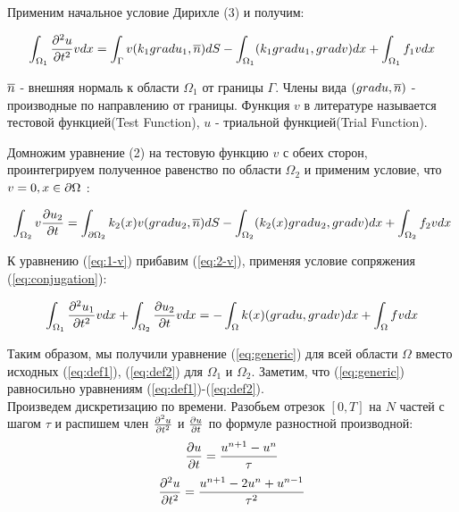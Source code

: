 Применим начальное условие Дирихле (3) и получим:

\begin{equation}
    \int_{\Omega_1} {\frac{\partial^2 u}{\partial t^2}} v dx  = \int_\Gamma v(k_1 gradu_1, \overline{n}) dS - \int_{\Omega_1}(k_1 gradu_1, gradv)dx + \int_{\Omega_1} f_1vdx 
    \label{eq:1-v}
\end{equation}


$\overline{n}$ - внешняя нормаль к области $\Omega_1$ от границы $\Gamma$.
Члены вида $(grad u, \overline{n})$ - производные по направлению от границы. 
Функция $v$ в литературе называется тестовой функцией(Test Function)\cite{bib:logg}, $u$ - триальной функцией(Trial Function).

Домножим уравнение (2) на тестовую функцию $v$ с обеих сторон, проинтегрируем полученное равенство по области $\Omega_2$ и применим условие, что $v = 0, x \in {\partial \Omega}$ :

\begin{equation}
    \int_{\Omega_2} v{\frac{\partial u_2}{\partial t}} = \int_{{\partial \Omega}_2} k_2(x)v(grad u_2, \overline{n})dS - \int_{\Omega_2}(k_2(x) gradu_2, grad v) dx + \int_{\Omega_2} f_2vdx
    \label{eq:2-v}
\end{equation}


К уравнению (\ref{eq:1-v}) прибавим (\ref{eq:2-v}), применяя условие сопряжения (\ref{eq:conjugation}):

\begin{equation}
    \int_{\Omega_1} {\frac{\partial^2 u_1}{\partial t^2}} v dx + \int_{\Omega_2}{\frac{\partial u_2}{\partial t}}vdx  = -\int_{\Omega} k(x)(gradu, gradv)dx + \int_{\Omega} fv dx
    \label{eq:generic}
\end{equation}


Таким образом, мы получили уравнение (\ref{eq:generic}) для всей области $\Omega$ вместо
исходных (\ref{eq:def1}), (\ref{eq:def2}) для $\Omega_1$ и $\Omega_2$. Заметим, что (\ref{eq:generic}) равносильно уравнениям (\ref{eq:def1})-(\ref{eq:def2}).\\

Произведем дискретизацию по времени. Разобьем отрезок $[0, T]$ на $N$ частей с шагом $\tau$
и распишем член ${\frac{\partial^2 u}{\partial t^2}}$ и ${\frac{\partial u}{\partial t}}$ по формуле разностной производной:
\begin{equation}
     {\frac{\partial u}{\partial t}} = \frac{u^{n+1} - u^{n}}{\tau} 
     \label{eq:pdt-discr}
\end{equation}
\begin{equation}
     {\frac{\partial^2 u}{\partial t^2}} = \frac{u^{n+1} - 2 u^n + u^{n-1}}{\tau^2} 
     \label{eq:pdtt-discr}
\end{equation}

